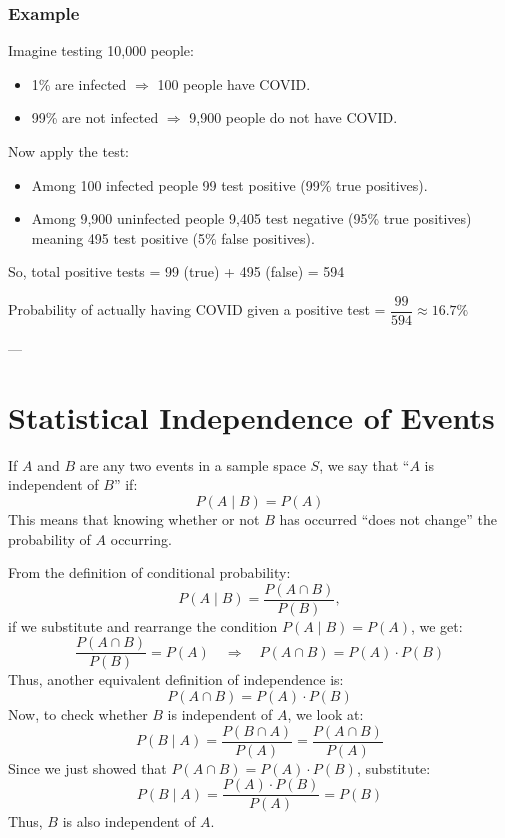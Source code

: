 \documentclass[twoside]{book}
\begin{document}
\subsubsection{Example}

Imagine testing 10{,}000 people:

\begin{itemize}
    \item 1\% are infected $\Rightarrow$ 100 people have COVID.
    \item 99\% are not infected $\Rightarrow$ 9{,}900 people do not have COVID.
\end{itemize}

Now apply the test:

\begin{itemize}
    \item Among 100 infected people 99 test positive (99\% true positives).
    \item Among 9{,}900 uninfected people 9{,}405 test negative (95\% true positives) meaning 495 test positive (5\% false positives).
\end{itemize}

\noindent
So, total positive tests = 99 (true) + 495 (false) = 594

Probability of actually having COVID given a positive test = $ \dfrac{99}{594} \approx 16.7\% $

---

\section{Statistical Independence of Events}

If $A$ and $B$ are any two events in a sample space $S$, we say that ``$A$ is independent of $B$'' if:
$$
P(A \mid B) = P(A)
$$
This means that knowing whether or not $B$ has occurred ``does not change'' the probability of $A$ occurring.

From the definition of conditional probability:
$$
P(A \mid B) = \frac{P(A \cap B)}{P(B)},
$$
if we substitute and rearrange the condition $P(A \mid B) = P(A)$, we get:
$$
\frac{P(A \cap B)}{P(B)} = P(A) \quad \Rightarrow \quad P(A \cap B) = P(A) \cdot P(B)
$$
Thus, another equivalent definition of independence is:
$$
P(A \cap B) = P(A) \cdot P(B)
$$
Now, to check whether $B$ is independent of $A$, we look at:
$$
P(B \mid A) = \frac{P(B \cap A)}{P(A)} = \frac{P(A \cap B)}{P(A)}
$$
Since we just showed that $P(A \cap B) = P(A) \cdot P(B)$, substitute:
$$
P(B \mid A) = \frac{P(A) \cdot P(B)}{P(A)} = P(B)
$$
Thus, $B$ is also independent of $A$.
\end{document}
